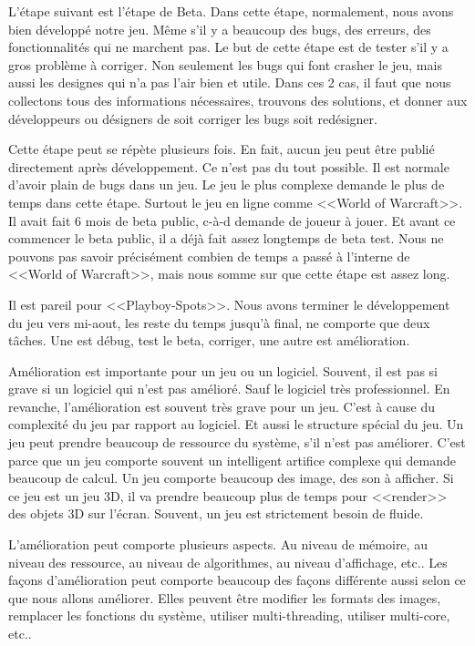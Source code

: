 L'étape suivant est l'étape de Beta. Dans cette étape, normalement, nous avons bien développé notre jeu. Même s'il y a beaucoup des bugs, des erreurs, des fonctionnalités qui ne marchent pas. Le but de cette étape est de tester s'il y a gros problème à corriger. Non seulement les bugs qui font crasher le jeu, mais aussi les designes qui n'a pas l'air bien et utile. Dans ces 2 cas, il faut que nous collectons tous des informations nécessaires, trouvons des solutions, et donner aux développeurs ou désigners de soit corriger les bugs soit redésigner. 

Cette étape peut se répète plusieurs fois. En fait, aucun jeu peut être publié directement après développement. Ce n'est pas du tout possible. Il est normale d'avoir plain de bugs dans un jeu. Le jeu le plus complexe demande le plus de temps dans cette étape. Surtout le jeu en ligne comme <<World of Warcraft>>. Il avait fait 6 mois de beta public, c-à-d demande de joueur à jouer. Et avant ce commencer le beta public, il a déjà fait assez longtemps de beta test. Nous ne pouvons pas savoir précisément combien de temps a passé à l'interne de <<World of Warcraft>>, mais nous somme sur que cette étape est assez long. 

Il est pareil pour <<Playboy-Spots>>. Nous avons terminer le développement du jeu vers mi-aout, les reste du temps jusqu'à final, ne comporte que deux tâches. Une est débug, test le beta, corriger, une autre est amélioration. 

Amélioration est importante pour un jeu ou un logiciel. Souvent, il est pas si grave si un logiciel qui n'est pas amélioré. Sauf le logiciel très professionnel. En revanche, l'amélioration est souvent très grave pour un jeu. C'est à cause du complexité du jeu par rapport au logiciel. Et aussi le structure spécial du jeu. Un jeu peut prendre beaucoup de ressource du système, s'il n'est pas améliorer. C'est parce que un jeu comporte souvent un intelligent artifice complexe qui demande beaucoup de calcul. Un jeu comporte beaucoup des image, des son à afficher. Si ce jeu est un jeu 3D, il va prendre beaucoup plus de temps pour <<render>> des objets 3D sur l'écran. Souvent, un jeu est strictement besoin de fluide. 

L'amélioration peut comporte plusieurs aspects. Au niveau de mémoire, au niveau des ressource, au niveau de algorithmes, au niveau d'affichage, etc.. Les façons d'amélioration peut comporte beaucoup des façons différente aussi selon ce que nous allons améliorer. Elles peuvent être modifier les formats des images, remplacer les fonctions du système, utiliser multi-threading, utiliser multi-core, etc..

